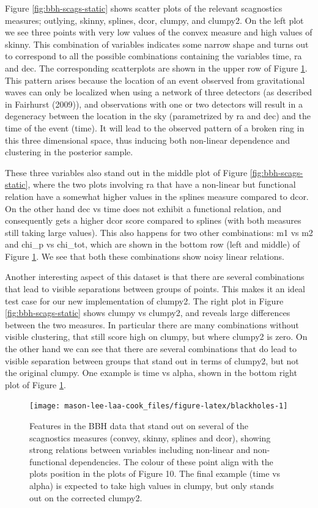 Figure \ref{fig:bbh-scags-static} shows scatter plots of the relevant scagnostics measures; outlying, skinny, splines, dcor, clumpy, and clumpy2. On the left plot we see three points with very low values of the convex measure and high values of skinny. This combination of variables indicates some narrow shape and turns out to correspond to all the possible combinations containing the variables time, ra and dec. The corresponding scatterplots are shown in the upper row of Figure \ref{fig:blackholes}. This pattern arises because the location of an event observed from gravitational waves can only be localized when using a network of three detectors (as described in Fairhurst (2009)), and observations with one or two detectors will result in a degeneracy between the location in the sky (parametrized by ra and dec) and the time of the event (time). It will lead to the observed pattern of a broken ring in this three dimensional space, thus inducing both non-linear dependence and clustering in the posterior sample.

These three variables also stand out in the middle plot of Figure \ref{fig:bbh-scags-static}, where the two plots involving ra that have a non-linear but functional relation have a somewhat higher values in the splines measure compared to dcor. On the other hand dec vs time does not exhibit a functional relation, and consequently gets a higher dcor score compared to splines (with both measures still taking large values). This also happens for two other combinations: m1 vs m2 and chi\_p vs chi\_tot, which are shown in the bottom row (left and middle) of Figure \ref{fig:blackholes}. We see that both these combinations show noisy linear relations.

Another interesting aspect of this dataset is that there are several combinations that lead to visible separations between groups of points. This makes it an ideal test case for our new implementation of clumpy2. The right plot in Figure \ref{fig:bbh-scags-static} shows clumpy vs clumpy2, and reveals large differences between the two measures. In particular there are many combinations without visible clustering, that still score high on clumpy, but where clumpy2 is zero. On the other hand we can see that there are several combinations that do lead to visible separation between groups that stand out in terms of clumpy2, but not the original clumpy. One example is time vs alpha, shown in the bottom right plot of Figure \ref{fig:blackholes}.

\begin{figure}
\texttt{[image: mason-lee-laa-cook\_files/figure-latex/blackholes-1]} \caption{Features in the BBH data that stand out on several of the scagnostics measures (convey, skinny, splines and dcor), showing strong relations between variables including non-linear and non-functional dependencies. The colour of these point align with the plots position in the plots of Figure 10. The final example (time vs alpha) is expected to take high values in clumpy, but only stands out on the corrected clumpy2.}\label{fig:blackholes}
\end{figure}

